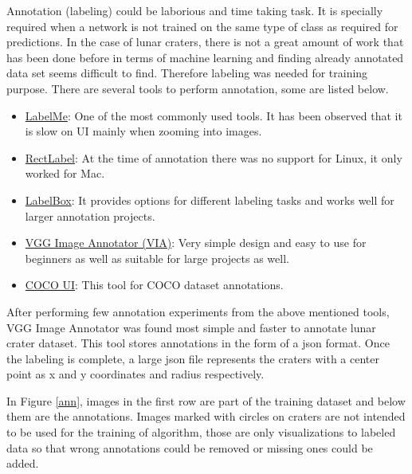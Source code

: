 \documentclass[11pt]{article}
\begin{document}
Annotation (labeling) could be laborious and time taking task. It is specially required when a network is not trained on the same type of class as required for predictions. In the case of lunar craters, there is not a great amount of work that has been done before in terms of machine learning and finding already annotated data set seems difficult to find. Therefore labeling was needed for training purpose. There are several tools to perform annotation, some are listed below.
\begin{itemize}
	\item \underline{LabelMe}: One of the most commonly used tools. It has been observed that it is slow on UI mainly when zooming into images.
	\item \underline{RectLabel}: At the time of annotation there was no support for Linux, it only worked for Mac.
	\item \underline{LabelBox}: It provides options for different labeling tasks and works well for larger annotation projects.
	\item \underline{VGG Image Annotator (VIA)}: Very simple design and easy to use for beginners as well as suitable for large projects as well.
	\item \underline{COCO UI}: This tool for COCO dataset annotations.
\end{itemize}

After performing few annotation experiments from the above mentioned tools, VGG Image Annotator was found most simple and faster to annotate lunar crater dataset. This tool stores annotations in the form of a json format. Once the labeling is complete, a large json file represents the craters with a center point as x and y coordinates and radius respectively.

In Figure \ref{ann}, images in the first row are part of the training dataset and below them are the annotations. Images marked with circles on craters are not intended to be used for the training of algorithm, those are only visualizations to labeled data so that wrong annotations could be removed or missing ones could be added.
\end{document}
